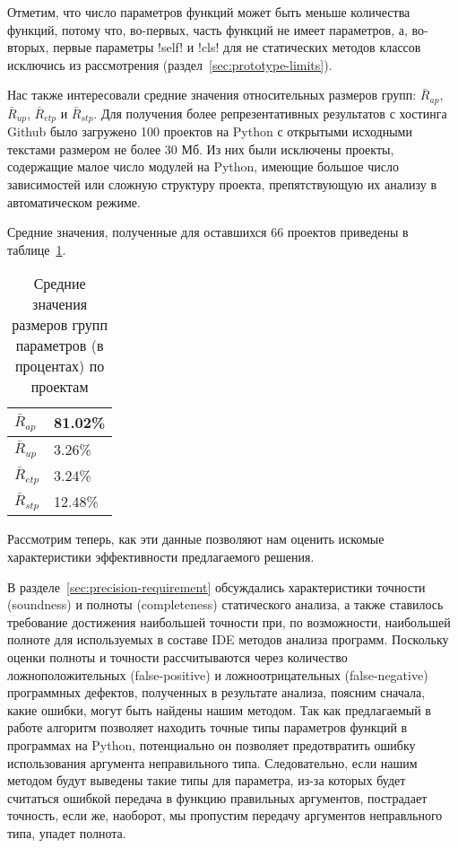 Отметим, что число параметров функций может быть меньше количества функций,
потому что, во-первых, часть функций не имеет параметров, а, во-вторых, первые
параметры !self! и !cls! для не статических методов классов исключись из
рассмотрения (раздел~\ref{sec:prototype-limits}).

Нас также интересовали средние значения относительных размеров групп: $\bar{R}_{ap}$,
$\bar{R}_{up}$, $\bar{R}_{etp}$ и $\bar{R}_{stp}$. Для получения более
репрезентативных результатов с хостинга Github было загружено 100 проектов на
Python с открытыми исходными текстами размером не более 30 Мб. Из них были
исключены проекты, содержащие малое число модулей на Python, имеющие большое
число зависимостей или сложную структуру проекта, препятствующую их анализу в
автоматическом режиме. 

Средние значения, полученные для оставшихся 66 проектов приведены в
таблице~\ref{tab:statistics-results-2}.

\begin{table}[H]
  \small
  \caption{Средние значения размеров групп параметров (в процентах) по проектам}
  \label{tab:statistics-results-2}
  \centering
  \begin{tabularx}{0.5\textwidth}{ |X|X| }

    \hline
    $\bar{R}_{ap}$ & 81.02\% \\ \hline

    $\bar{R}_{up}$ & 3.26\% \\ \hline

    $\bar{R}_{etp}$ & 3.24\% \\ \hline

    $\bar{R}_{stp}$ & 12.48\% \\ \hline

  \end{tabularx}
\end{table} 

Рассмотрим теперь, как эти данные позволяют нам оценить искомые характеристики
эффективности предлагаемого решения.

В разделе~\ref{sec:precision-requirement} обсуждались характеристики точности
(soundness) и полноты (completeness) статического анализа, а также ставилось
требование достижения наибольшей точности при, по возможности, наибольшей
полноте для используемых в составе IDE методов анализа программ. Поскольку
оценки полноты и точности рассчитываются через количество ложноположительных
(false-positive) и ложноотрицательных (false-negative) программных дефектов,
полученных в результате анализа, поясним сначала, какие ошибки, могут быть
найдены нашим методом.  Так как предлагаемый в работе алгоритм позволяет
находить точные типы параметров функций в программах на Python, потенциально он
позволяет предотвратить ошибку использования аргумента неправильного типа.
Следовательно, если нашим методом будут выведены такие типы для параметра, из-за
которых будет считаться ошибкой передача в функцию правильных аргументов,
пострадает точность, если же, наоборот, мы пропустим передачу аргументов
неправльного типа, упадет полнота.

